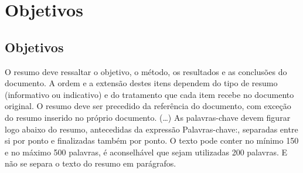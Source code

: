 \chapter[Objetivos]{Objetivos}
\section{Objetivos}

 O resumo deve ressaltar o objetivo, o método, os resultados e as conclusões
 do documento. A ordem e a extensão
 destes itens dependem do tipo de resumo (informativo ou indicativo) e do
 tratamento que cada item recebe no documento original. O resumo deve ser
 precedido da referência do documento, com exceção do resumo inserido no
 próprio documento. (\ldots) As palavras-chave devem figurar logo abaixo do
 resumo, antecedidas da expressão Palavras-chave:, separadas entre si por
 ponto e finalizadas também por ponto. O texto pode conter no mínimo 150 e
 no máximo 500 palavras, é aconselhável que sejam utilizadas 200 palavras.
 E não se separa o texto do resumo em parágrafos.
